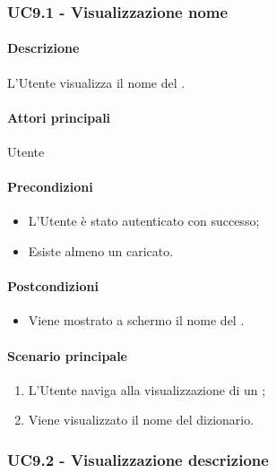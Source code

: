 
\subsubsection{UC9.1 - Visualizzazione nome }\label{UC9point1}
\paragraph*{Descrizione}
L’Utente visualizza il nome del .

\paragraph*{Attori principali}
Utente

\paragraph*{Precondizioni}
\begin{itemize}
  \item L’Utente è stato autenticato con successo;
  \item Esiste almeno un  caricato.
\end{itemize}

\paragraph*{Postcondizioni}
\begin{itemize}
  \item Viene mostrato a schermo il nome del .
\end{itemize}

\paragraph*{Scenario principale}
\begin{enumerate}
  \item L’Utente naviga alla visualizzazione di un ;
  \item Viene visualizzato il nome del dizionario.  
\end{enumerate}


\subsubsection{UC9.2 - Visualizzazione descrizione }\label{UC9point2}

